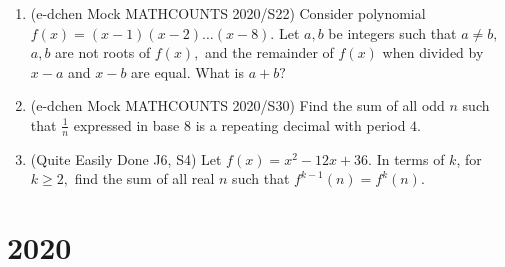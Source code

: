 \documentclass{article}
\begin{document}
\begin{enumerate}
\item (e-dchen Mock MATHCOUNTS 2020/S22) Consider polynomial $f(x)=(x-1)(x-2)\dots(x-8).$ Let $a,b$ be integers such that $a\neq b,$ $a,b$ are not roots of $f(x),$ and the remainder of $f(x)$ when divided by $x-a$ and $x-b$ are equal. What is $a+b?$

\item (e-dchen Mock MATHCOUNTS 2020/S30) Find the sum of all odd $n$ such that $\frac{1}{n}$ expressed in base $8$ is a repeating decimal with period $4.$

\item (Quite Easily Done J6, S4) Let $f(x)=x^2-12x+36.$ In terms of $k$, for $k\geq 2,$ find the sum of all real $n$ such that $f^{k-1}(n)=f^k(n).$
\end{enumerate}

\section{2020}
\end{document}
